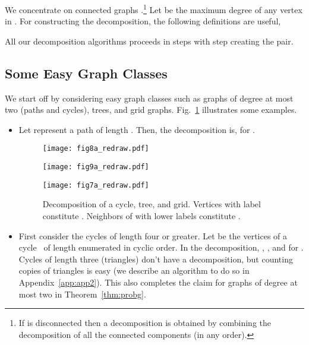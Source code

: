\documentclass[11pt]{article}
\newcommand{\FI}[1]{Fig.\ \ref{#1}}
\begin{document}
We concentrate on connected graphs .\!\footnote{If  is disconnected then a decomposition is obtained by combining the decomposition of all the connected components (in any order).} Let  be the maximum degree of any vertex in . For constructing the decomposition, the following definitions are useful, 
 
All our decomposition algorithms proceeds in steps with step  creating the  pair. 

\subsection{Some Easy Graph Classes} \label{simp}
We start off by considering easy graph classes such as graphs of degree at most two (paths and cycles), trees, and grid graphs. \FI{tri} illustrates some examples. 
\begin{itemize}
\item {} Let  represent a path  of length . Then, the decomposition is,  for . 
\begin{figure}[btp]
\centering
\hfill
\begin{minipage}[t]{.3\textwidth}
\begin{center}  
\vspace*{-.4in}
\texttt{[image: fig8a\_redraw.pdf]}
\end{center}
\end{minipage}
\hfill
\begin{minipage}[t]{.3\textwidth}
\begin{center}  
\vspace*{-.4in}
\texttt{[image: fig9a\_redraw.pdf]}
\end{center}
\end{minipage}
\hfill
\begin{minipage}[t]{.3\textwidth}
\begin{center}  
\vspace*{-.4in}
\texttt{[image: fig7a\_redraw.pdf]}
\end{center}
\end{minipage}
\hfill
\caption{Decomposition of a cycle, tree, and grid.  Vertices with label  constitute . Neighbors of  with lower labels constitute .}
\label{tri}
\end{figure}

\item {} First consider the cycles of length four or greater.  Let  be the vertices of a cycle~ of length  enumerated in cyclic order. In the decomposition, , , and  for . Cycles of length three (triangles) don't have a decomposition, but counting copies of triangles is easy (we describe an algorithm to do so in Appendix~\ref{app:app2}). This also completes the claim for graphs of degree at most two in Theorem~\ref{thm:probg}.


\end{itemize}
\end{document}
